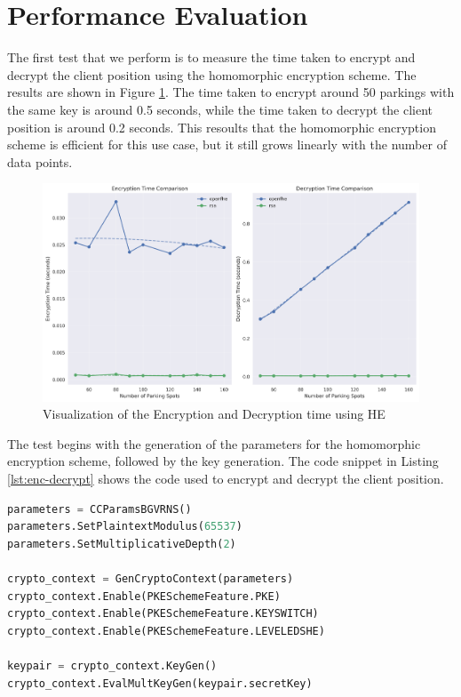 \section{Performance Evaluation} \label{sec:testing-performance}

The first test that we perform is to measure the time taken to encrypt and decrypt the client position using the homomorphic encryption scheme. The results are shown in Figure \ref{fig:testing-enc}. The time taken to encrypt around 50 parkings with the same key is around 0.5 seconds, while the time taken to decrypt the client position is around 0.2 seconds. This resoults that the homomorphic encryption scheme is efficient for this use case, but it still grows linearly with the number of data points.

\begin{figure}[h]
    \centering
    \includegraphics[width=\columnwidth]{img/crypto_times.png}
    \caption{Visualization of the Encryption and Decryption time using HE}
    \label{fig:testing-enc}
\end{figure}

The test begins with the generation of the parameters for the homomorphic encryption scheme, followed by the key generation. The code snippet in Listing \ref{lst:enc-decrypt} shows the code used to encrypt and decrypt the client position.

\newpage

\begin{lstlisting}[language=python, caption={Encryption and Decryption of the client position}, label={lst:enc-decrypt}]
parameters = CCParamsBGVRNS()
parameters.SetPlaintextModulus(65537)
parameters.SetMultiplicativeDepth(2)

crypto_context = GenCryptoContext(parameters)
crypto_context.Enable(PKESchemeFeature.PKE)
crypto_context.Enable(PKESchemeFeature.KEYSWITCH)
crypto_context.Enable(PKESchemeFeature.LEVELEDSHE)

keypair = crypto_context.KeyGen()
crypto_context.EvalMultKeyGen(keypair.secretKey)
\end{lstlisting}


